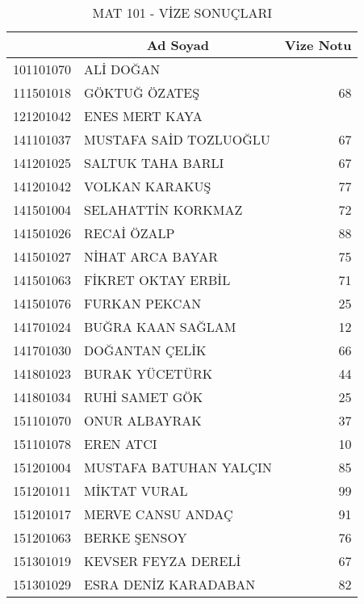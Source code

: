 \documentclass[12pt]{article}
\begin{document}
\begin{multicols}{2}
  
    \begin{longtable}{||r||l||r||}
    \caption{MAT 101 - VİZE SONUÇLARI}\\
    \toprule
    \toprule
    \rowcolor[rgb]{ 1,  .8,  1} \multicolumn{1}{||c||}{\textbf{Öğrenci No}} & \multicolumn{1}{c||}{\textbf{Ad Soyad}} & \multicolumn{1}{c||}{\textbf{Vize Notu}} \\
    \midrule
    \midrule
\endhead    
    101101070 & ALİ DOĞAN &  \\
    \midrule
    111501018 & GÖKTUĞ ÖZATEŞ & 68 \\
    \midrule
    121201042 & ENES MERT KAYA &  \\
    \midrule
    141101037 & MUSTAFA SAİD TOZLUOĞLU & 67 \\
    \midrule
    141201025 & SALTUK TAHA BARLI & 67 \\
    \midrule
    141201042 & VOLKAN KARAKUŞ & 77 \\
    \midrule
    141501004 & SELAHATTİN KORKMAZ & 72 \\
    \midrule
    141501026 & RECAİ ÖZALP & 88 \\
    \midrule
    141501027 & NİHAT ARCA BAYAR & 75 \\
    \midrule
    141501063 & FİKRET OKTAY ERBİL & 71 \\
    \midrule
    141501076 & FURKAN PEKCAN & 25 \\
    \midrule
    141701024 & BUĞRA KAAN SAĞLAM & 12 \\
    \midrule
    141701030 & DOĞANTAN ÇELİK & 66 \\
    \midrule
    141801023 & BURAK YÜCETÜRK & 44 \\
    \midrule
    141801034 & RUHİ SAMET GÖK & 25 \\
    \midrule
    151101070 & ONUR ALBAYRAK & 37 \\
    \midrule
    151101078 & EREN ATCI & 10 \\
    \midrule
    151201004 & MUSTAFA BATUHAN YALÇIN & 85 \\
    \midrule
    151201011 & MİKTAT VURAL & 99 \\
    \midrule
    151201017 & MERVE CANSU ANDAÇ & 91 \\
    \midrule
    151201063 & BERKE ŞENSOY & 76 \\
    \midrule
    151301019 & KEVSER FEYZA DERELİ & 67 \\
    \midrule
    151301029 & ESRA DENİZ KARADABAN & 82 \\

\end{longtable}
\end{multicols}
\end{document}

